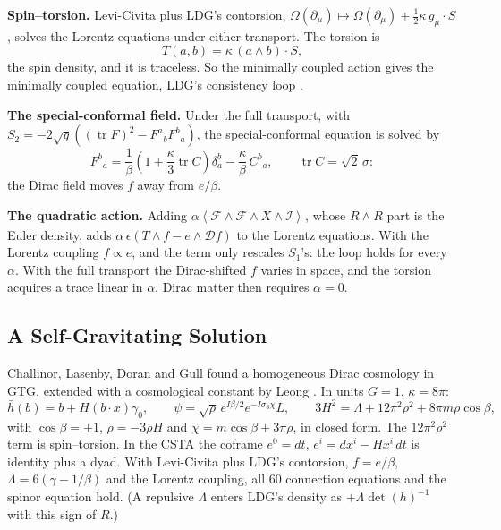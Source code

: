 \documentclass[11pt,a4paper]{article}
\newcommand{\D}{\mathcal{D}}
\newcommand{\F}{\mathcal{F}}
\newcommand{\Om}{\Omega}
\newcommand{\grade}[2]{\left\langle #1\right\rangle_{#2}}
\begin{document}
\textbf{Spin--torsion.} Levi-Civita plus LDG's contorsion,
\(\Om(\partial_\mu)\mapsto\Om(\partial_\mu)+\tfrac12\kappa\,g_\mu\cdot S\),
solves the Lorentz equations under either transport. The torsion is
\[
    \boxed{
        T(a,b)=\kappa\,(a\wedge b)\cdot S,
    }
\]
the spin density, and it is traceless. So the minimally coupled action
gives the minimally coupled equation, LDG's consistency
loop \cite[(4.32)--(4.35)]{LDG}.

\textbf{The special-conformal field.} Under the full transport, with
\(S_2=-2\sqrt g\left((\operatorname{tr}F)^2-F^a{}_bF^b{}_a\right)\), the
special-conformal equation is solved by
\[
    F^b{}_a=\frac1\beta\left(1+\frac\kappa3\operatorname{tr}C\right)
    \delta^b_a-\frac\kappa\beta\,C^b{}_a,
    \qquad
    \operatorname{tr}C=\sqrt2\,\sigma:
\]
the Dirac field moves \(f\) away from \(e/\beta\).

\textbf{The quadratic action.} Adding
\(\alpha\grade{\F\wedge\F\wedge X\wedge\mathcal I}{}\), whose
\(R\wedge R\) part is the Euler density, adds
\(\alpha\,\epsilon(T\wedge f-e\wedge\D f)\) to the Lorentz equations.
With the Lorentz coupling \(f\propto e\), and the term only rescales
\(S_1\)'s: the loop holds for every \(\alpha\). With the full transport
the Dirac-shifted \(f\) varies in space, and the torsion acquires a trace
linear in \(\alpha\). Dirac matter then requires \(\alpha=0\).

\subsection{A Self-Gravitating Solution}

Challinor, Lasenby, Doran and Gull \cite{CLDG} found a homogeneous Dirac
cosmology in GTG, extended with a cosmological constant by Leong
\cite{Leong}. In units \(G=1\), \(\kappa=8\pi\):
\[
    \bar h(b)=b+H(b\cdot x)\gamma_0,\qquad
    \psi=\sqrt\rho\,e^{I\beta/2}e^{-I\sigma_3\chi}L,\qquad
    3H^2=\Lambda+12\pi^2\rho^2+8\pi m\rho\cos\beta,
\]
with \(\cos\beta=\pm1\), \(\dot\rho=-3\rho H\) and
\(\dot\chi=m\cos\beta+3\pi\rho\), in closed form. The
\(12\pi^2\rho^2\) term is spin--torsion. In the CSTA the coframe
\(e^0=dt\), \(e^i=dx^i-Hx^i\,dt\) is identity plus a dyad. With
Levi-Civita plus LDG's contorsion, \(f=e/\beta\),
\(\Lambda=6(\gamma-1/\beta)\) and the Lorentz coupling, all
60 connection equations and the spinor equation hold. (A repulsive
\(\Lambda\) enters LDG's density as \(+\Lambda\det(h)^{-1}\) with
this sign of \(R\).)
\end{document}
